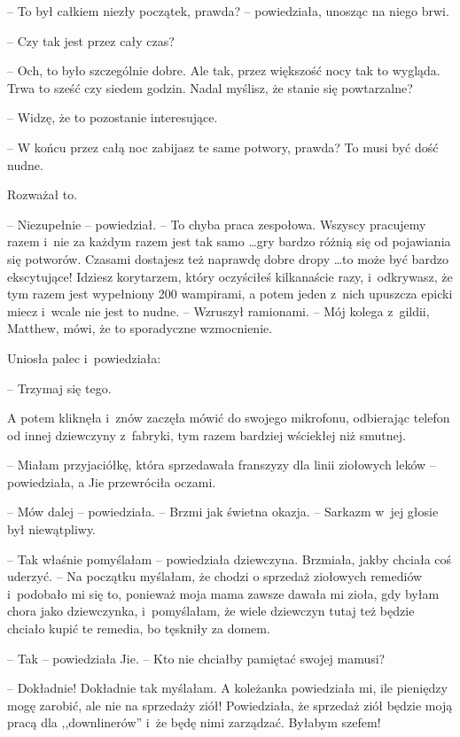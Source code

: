 \documentclass[oneside,polish,11pt,rmheadings]{mwbk}
\begin{document}
-- To był całkiem niezły początek, prawda? -- powiedziała, unosząc na niego brwi.

-- Czy tak jest przez cały czas?

-- Och, to było szczególnie dobre. Ale tak, przez większość nocy tak to wygląda. Trwa to sześć czy siedem godzin. Nadal myślisz, że stanie się powtarzalne?

-- Widzę, że to pozostanie interesujące.

-- W końcu przez całą noc zabijasz te same potwory, prawda? To musi być dość nudne.

Rozważał to. 

-- Niezupełnie -- powiedział. -- To chyba praca zespołowa. Wszyscy pracujemy razem i~nie za każdym razem jest tak samo  \ldots  gry bardzo różnią się od pojawiania się potworów. Czasami dostajesz też naprawdę dobre dropy  \ldots  to może być bardzo ekscytujące! Idziesz korytarzem, który oczyściłeś kilkanaście razy, i~odkrywasz, że tym razem jest wypełniony 200 wampirami, a potem jeden z~nich upuszcza epicki miecz i~wcale nie jest to nudne. -- Wzruszył ramionami. -- Mój kolega z~gildii, Matthew, mówi, że to sporadyczne wzmocnienie.

Uniosła palec i~powiedziała: 

-- Trzymaj się tego.

A potem kliknęła i~znów zaczęła mówić do swojego mikrofonu, odbierając telefon od innej dziewczyny z~fabryki, tym razem bardziej wściekłej niż smutnej. 

-- Miałam przyjaciółkę, która sprzedawała franszyzy dla linii ziołowych leków -- powiedziała, a Jie przewróciła oczami.

-- Mów dalej -- powiedziała. -- Brzmi jak świetna okazja. -- Sarkazm w~jej głosie był niewątpliwy.

-- Tak właśnie pomyślałam -- powiedziała dziewczyna. Brzmiała, jakby chciała coś uderzyć. -- Na początku myślałam, że chodzi o sprzedaż ziołowych remediów i~podobało mi się to, ponieważ moja mama zawsze dawała mi zioła, gdy byłam chora jako dziewczynka, i~pomyślałam, że wiele dziewczyn tutaj też będzie chciało kupić te remedia, bo tęskniły za domem.

-- Tak -- powiedziała Jie. -- Kto nie chciałby pamiętać swojej mamusi? 

-- Dokładnie! Dokładnie tak myślałam. A koleżanka powiedziała mi, ile pieniędzy mogę zarobić, ale nie na sprzedaży ziół! Powiedziała, że sprzedaż ziół będzie moją pracą dla ,,downlinerów'' i~że będę nimi zarządzać. Byłabym szefem! 
\end{document}
